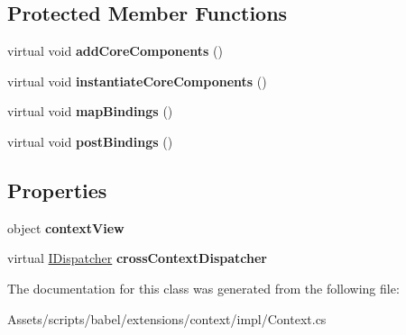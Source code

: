 \subsection*{Protected Member Functions}
\begin{DoxyCompactItemize}
\item 
\hypertarget{classbabel_1_1extensions_1_1context_1_1impl_1_1_context_ab899fe9e5a1bf2ac38151583e20ffbcb}{virtual void {\bfseries add\-Core\-Components} ()}\label{classbabel_1_1extensions_1_1context_1_1impl_1_1_context_ab899fe9e5a1bf2ac38151583e20ffbcb}

\item 
\hypertarget{classbabel_1_1extensions_1_1context_1_1impl_1_1_context_a82f752da34419afed0e623fafc7a53f8}{virtual void {\bfseries instantiate\-Core\-Components} ()}\label{classbabel_1_1extensions_1_1context_1_1impl_1_1_context_a82f752da34419afed0e623fafc7a53f8}

\item 
\hypertarget{classbabel_1_1extensions_1_1context_1_1impl_1_1_context_a1e0c5667b4f59bd6041b6f77b86090bb}{virtual void {\bfseries map\-Bindings} ()}\label{classbabel_1_1extensions_1_1context_1_1impl_1_1_context_a1e0c5667b4f59bd6041b6f77b86090bb}

\item 
\hypertarget{classbabel_1_1extensions_1_1context_1_1impl_1_1_context_a3f53a8791112ded9d58e529969d214b5}{virtual void {\bfseries post\-Bindings} ()}\label{classbabel_1_1extensions_1_1context_1_1impl_1_1_context_a3f53a8791112ded9d58e529969d214b5}

\end{DoxyCompactItemize}
\subsection*{Properties}
\begin{DoxyCompactItemize}
\item 
\hypertarget{classbabel_1_1extensions_1_1context_1_1impl_1_1_context_a08b3714bd48fd30581c3905ad850afb5}{object {\bfseries context\-View}}\label{classbabel_1_1extensions_1_1context_1_1impl_1_1_context_a08b3714bd48fd30581c3905ad850afb5}

\item 
\hypertarget{classbabel_1_1extensions_1_1context_1_1impl_1_1_context_a86378bc80e5954900381108f3481d545}{virtual \hyperlink{interfacebabel_1_1extensions_1_1dispatcher_1_1api_1_1_i_dispatcher}{I\-Dispatcher} {\bfseries cross\-Context\-Dispatcher}}\label{classbabel_1_1extensions_1_1context_1_1impl_1_1_context_a86378bc80e5954900381108f3481d545}

\end{DoxyCompactItemize}


The documentation for this class was generated from the following file\-:\begin{DoxyCompactItemize}
\item 
Assets/scripts/babel/extensions/context/impl/Context.\-cs\end{DoxyCompactItemize}
